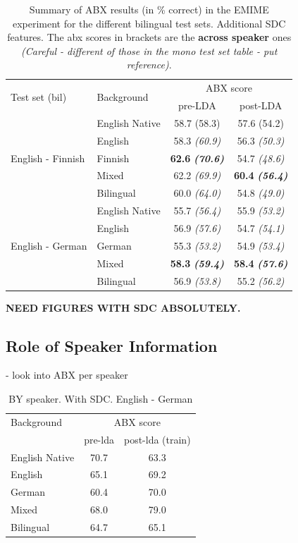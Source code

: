 \begin{table}[]
\centering
\begin{tabular}{@{}llcc@{}}
\toprule
\multirow{2}{*}{Test set (bil)} & \multirow{2}{*}{Background} & \multicolumn{2}{c}{ABX score} \\  \cline{3-4}
 &  & pre-LDA & post-LDA \\ \midrule
\multirow{5}{*}{English - Finnish} & English Native & 58.7 (58.3) & 57.6 (54.2) \\
 & English & 58.3 \textit{(60.9)} & 56.3 \textit{(50.3)} \\
 & Finnish & \textbf{62.6} \textbf{\textit{(70.6)}} & 54.7 \textit{(48.6)} \\
 & Mixed & 62.2 \textit{(69.9)} & \textbf{60.4} \textbf{\textit{(56.4)}} \\
 & Bilingual & 60.0 \textit{(64.0)} & 54.8 \textit{(49.0)} \\ \midrule
\multirow{5}{*}{English - German} & English Native & 55.7 \textit{(56.4)} & 55.9 \textit{(53.2)} \\
 & English & 56.9 \textit{(57.6)} & 54.7 \textit{(54.1)} \\
 & German & 55.3 \textit{(53.2)} & 54.9 \textit{(53.4)} \\
 & Mixed & \textbf{58.3} \textbf{\textit{(59.4)}} & \textbf{58.4} \textbf{\textit{(57.6)}} \\
 & Bilingual & 56.9 \textit{(53.8)} & 55.2 \textit{(56.2)} \\ \bottomrule
\end{tabular}
\caption{Summary of ABX results (in \% correct) in the EMIME experiment for the different bilingual test sets.  Additional SDC features. The abx scores in brackets are the \textbf{across speaker} ones \textit{(Careful - different of those in the mono test set table - put reference)}. }
\label{Table: xxx}
\end{table}

\textbf{NEED FIGURES WITH SDC ABSOLUTELY. }
\subsection{Role of Speaker Information}

- look into ABX per speaker

\begin{table}[]
\begin{tabular}{lcc}
\hline
Background & \multicolumn{2}{c}{ABX score} \\
 & pre-lda & post-lda (train) \\ \hline
English Native & 70.7 & 63.3 \\
English & 65.1 & 69.2 \\
German & 60.4 & 70.0 \\
Mixed & 68.0 & 79.0 \\
Bilingual & 64.7 & 65.1 \\ \hline
\end{tabular}
\caption{BY speaker. With SDC. English - German}
\end{table}




